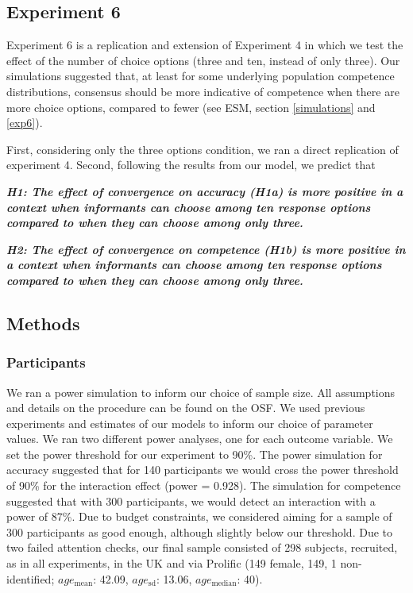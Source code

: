 \documentclass[
  doc,floatsintext]{apa6}
\begin{document}
\subsection{Experiment 6}\label{experiment-6}

Experiment 6 is a replication and extension of Experiment 4 in which we test the effect of the number of choice options (three and ten, instead of only three). Our simulations suggested that, at least for some underlying population competence distributions, consensus should be more indicative of competence when there are more choice options, compared to fewer (see ESM, section \ref{simulations} and \ref{exp6}).

First, considering only the three options condition, we ran a direct replication of experiment 4. Second, following the results from our model, we predict that

\textbf{\emph{H1: The effect of convergence on accuracy (H1a) is more positive in a context when informants can choose among ten response options compared to when they can choose among only three.}}

\textbf{\emph{H2: The effect of convergence on competence (H1b) is more positive in a context when informants can choose among ten response options compared to when they can choose among only three.}}

\subsection{Methods}\label{methods-5}

\subsubsection{Participants}\label{participants-5}

We ran a power simulation to inform our choice of sample size. All assumptions and details on the procedure can be found on the OSF. We used previous experiments and estimates of our models to inform our choice of parameter values. We ran two different power analyses, one for each outcome variable. We set the power threshold for our experiment to 90\%. The power simulation for accuracy suggested that for 140 participants we would cross the power threshold of 90\% for the interaction effect (power = 0.928). The simulation for competence suggested that with 300 participants, we would detect an interaction with a power of 87\%. Due to budget constraints, we considered aiming for a sample of 300 participants as good enough, although slightly below our threshold. Due to two failed attention checks, our final sample consisted of 298 subjects, recruited, as in all experiments, in the UK and via Prolific (149 female, 149, 1 non-identified; \(age_\text{mean}\): 42.09, \(age_\text{sd}\): 13.06, \(age_\text{median}\): 40).
\end{document}
